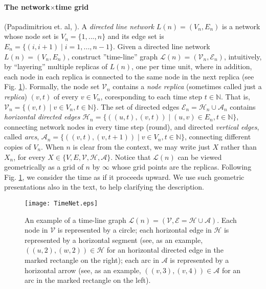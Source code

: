 \documentclass[11pt]{article}
\newcommand{\calL}{\mathcal{L}}
\newcommand{\calV}{\mathcal{V}}
\newcommand{\calE}{\mathcal{E}}
\newcommand{\calH}{\mathcal{H}}
\newcommand{\calA}{\mathcal{A}}
\newcommand{\naturals}{\mathbb{N}}
\newcommand{\rep}[2]{(#1,#2)}
\newcommand{\nn}{n}
\begin{document}
\paragraph*{\bf The network$\times$time grid} (Papadimitriou et. al, \cite{papa3}).
A {\em directed line network } $L(\nn)=(V_\nn,E_\nn)$ is a network whose node set is $V_\nn=\{1,...,n\}$ and its edge set is $E_\nn=\{(i,i+1) \mid i=1,...,n-1\}$.
Given a directed line network $L(\nn)=(V_\nn,E_\nn)$, construct ''time-line'' graph $\calL(\nn)=(\calV_\nn,\calE_\nn)$, intuitively, by ``layering'' multiple replicas of $L(\nn)$,
one per time unit, where in addition, each node in each replica is connected to the same node in
the next replica
(see Fig. \ref{figure:TimeNet}).
Formally, the node set $\calV_n$ contains a {\em node replica}
(sometimes called just a {\em replica}) $\rep{v}{t}$ of every $v \in V_n$,
coresponding to each time step $t \in \naturals$.
That is, $\calV_n=\{\rep{v}{t} \mid v\in V_n, t\in \naturals \}$.
The set of directed edges $\calE_n=\calH_n\cup\calA_n$ contains \emph{horizontal directed edges}
$\calH_n=\{ (\rep{u}{t},\rep{v}{t}) \mid (u,v)\in E_n, t\in \naturals\}$,
connecting network nodes in every time step (round),
and directed {\em vertical edges}, called {\em arcs},
$\calA_n=\{ (\rep{v}{t},\rep{v}{t+1}) \mid v\in V_n, t\in \naturals\}$,
connecting different copies of $V_n$.
When $n$ is clear from the context, we may write just $X$ rather than $X_n$, for every $X\in\{V,E,\calV,\calH,\calA\}$.
Notice that $\calL(\nn)$ can be viewed geometrically as a
grid of $n$ by $\infty$ whose grid points are the replicas.
Following Fig. \ref{figure:TimeNet}, we consider the time as if it proceeds upward.
We use such geometric presentations also in the text, to help clarifying the description.




\begin{figure}[ht]
\begin{center}
\texttt{[image: TimeNet.eps]}
\end{center}
\caption{\sf \label{figure:TimeNet}
An example of a time-line graph $\calL(n)=(\calV,\calE=\calH\cup\calA)$.
Each node in $\calV$ is represented by a circle;
 each horizontal edge in $\calH$ is represented by a horizontal segment (see, as an example, $(\rep{u}{2},\rep{w}{2})\in\calH$ for an horizontal directed edge in the marked  rectangle on the right);
each arc in $\calA$ is represented by a horizontal arrow (see, as an example,
$(\rep{v}{3},\rep{v}{4})\in\calA$ for an arc in the marked  rectangle on the left).
}
\end{figure}
\end{document}
